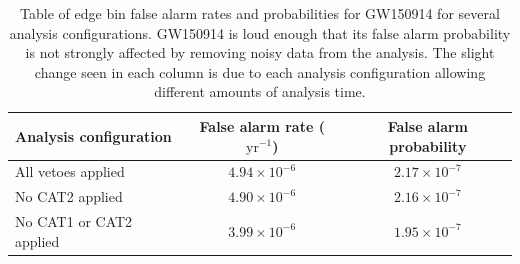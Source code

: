 \begin{table}[!ht]%
  \begin{center}
    \begin{tabular}{lcc}
      \hline
      Analysis configuration & False alarm rate ($\mathrm{yr}^{-1}$) & False alarm probability \\ \hline
      All vetoes applied & $4.94\times10^{-6}$ & $2.17\times10^{-7}$ \\
      No CAT2 applied & $4.90\times10^{-6}$ & $2.16\times10^{-7}$ \\
      No CAT1 or CAT2 applied & $3.99\times10^{-6}$ & $1.95\times10^{-7}$ \\
      \hline
    \end{tabular}
  \end{center}
  \caption[GW150914 FAR]{Table of edge bin false alarm rates and probabilities for GW150914 for several analysis %
           configurations. GW150914 is loud enough that its false alarm probability %
           is not strongly affected by removing noisy data from the analysis. The slight change seen %
           in each column is due to each analysis configuration allowing different amounts of %
           analysis time. %
           }
  \label{table:150914-far}
\end{table}

